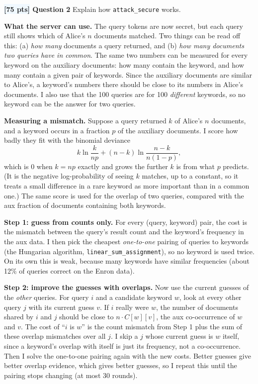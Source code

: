 \documentclass[12pt]{article}
\newcommand{\question}[2]{\textbf{\colorbox{aliceblue}{[#2 pts]} Question #1}}
\begin{document}
\question{2}{75} Explain how \texttt{attack\_secure} works.

\begin{answer}
    \textbf{What the server can use.}
    The query tokens are now secret, but each query still shows which of Alice's $n$ documents matched.
    Two things can be read off this: (a) \emph{how many} documents a query returned, and (b) \emph{how many documents two queries have in common}.
    The same two numbers can be measured for every keyword on the auxiliary documents: how many contain the keyword, and how many contain a given pair of keywords.
    Since the auxiliary documents are similar to Alice's, a keyword's numbers there should be close to its numbers in Alice's documents.
    I also use that the 100 queries are for 100 \emph{different} keywords, so no keyword can be the answer for two queries.

    \textbf{Measuring a mismatch.}
    Suppose a query returned $k$ of Alice's $n$ documents, and a keyword occurs in a fraction $p$ of the auxiliary documents.
    I score how badly they fit with the binomial deviance
    \[ k\ln\frac{k}{np} + (n-k)\ln\frac{n-k}{n(1-p)}, \]
    which is $0$ when $k = np$ exactly and grows the further $k$ is from what $p$ predicts.
    (It is the negative log-probability of seeing $k$ matches, up to a constant, so it treats a small difference in a rare keyword as more important than in a common one.)
    The same score is used for the overlap of two queries, compared with the aux fraction of documents containing both keywords.

    \textbf{Step 1: guess from counts only.}
    For every (query, keyword) pair, the cost is the mismatch between the query's result count and the keyword's frequency in the aux data.
    I then pick the cheapest \emph{one-to-one} pairing of queries to keywords (the Hungarian algorithm, \texttt{linear\_sum\_assignment}), so no keyword is used twice.
    On its own this is weak, because many keywords have similar frequencies (about 12\% of queries correct on the Enron data).

    \textbf{Step 2: improve the guesses with overlaps.}
    Now use the current guesses of the \emph{other} queries.
    For query $i$ and a candidate keyword $w$, look at every other query $j$ with its current guess $v$.
    If $i$ really were $w$, the number of documents shared by $i$ and $j$ should be close to $n \cdot C[w][v]$, the aux co-occurrence of $w$ and $v$.
    The cost of ``$i$ is $w$'' is the count mismatch from Step 1 plus the sum of these overlap mismatches over all $j$.
    I skip a $j$ whose current guess is $w$ itself, since a keyword's overlap with itself is just its frequency, not a co-occurrence.
    Then I solve the one-to-one pairing again with the new costs.
    Better guesses give better overlap evidence, which gives better guesses, so I repeat this until the pairing stops changing (at most 30 rounds).


\end{answer}
\end{document}

